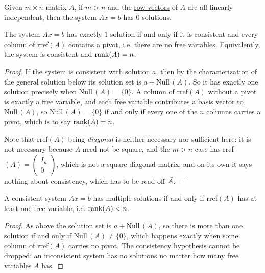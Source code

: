   \begin{corollary}
    \label{thm:overdetermined-systems-with-independent-rows}
    Given $m \times n$ matrix $A$, if $m > n$ and the \hyperref[def:row-vector]{row vectors} of $A$ are all linearly independent, then the system $A x = b$ has 0 solutions. 
  \end{corollary}

  \begin{theorem}
    \label{thm:criterion-for-a-unique-solution}
    The system $A x = b$ has exactly 1 solution if and only if it is consistent and every column of rref$(A)$ contains a pivot, i.e. there are no free variables. Equivalently, the system is consistent and $\operatorname{rank}(A) = n$. 
  \end{theorem}

  \begin{proof}
    If the system is consistent with solution $a$, then by the characterization of the general solution below its solution set is $a + \text{Null}\,(A)$. So it has exactly one solution precisely when $\text{Null}\,(A) = \{0\}$. A column of rref$(A)$ without a pivot is exactly a free variable, and each free variable contributes a basis vector to $\text{Null}\,(A)$, so $\text{Null}\,(A) = \{0\}$ if and only if every one of the $n$ columns carries a pivot, which is to say $\operatorname{rank}(A) = n$. 

    Note that rref$(A)$ being \textit{diagonal} is neither necessary nor sufficient here: it is not necessary because $A$ need not be square, and the $m > n$ case has rref$(A) = \begin{pmatrix} I_n \\ 0\end{pmatrix}$, which is not a square diagonal matrix; and on its own it says nothing about consistency, which has to be read off $\Tilde{A}$. 
  \end{proof}

  \begin{theorem}
    \label{thm:free-variables-and-multiple-solutions}
    A consistent system $A x = b$ has multiple solutions if and only if rref$(A)$ has at least one free variable, i.e. $\operatorname{rank}(A) < n$. 
  \end{theorem}
  \begin{proof}
    As above the solution set is $a + \text{Null}\,(A)$, so there is more than one solution if and only if $\text{Null}\,(A) \neq \{0\}$, which happens exactly when some column of rref$(A)$ carries no pivot. The consistency hypothesis cannot be dropped: an inconsistent system has no solutions no matter how many free variables $A$ has. 
  \end{proof}


